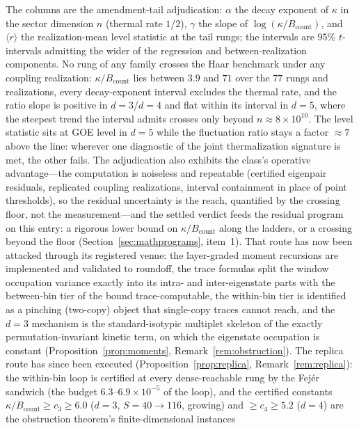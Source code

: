 \documentclass[11pt,a4paper]{article}
\theoremstyle{plain}
\theoremstyle{definition}
\theoremstyle{remark}
\begin{document}
\noindent The columns are the amendment-tail adjudication: $\alpha$ the decay exponent
of $\kappa$ in the sector dimension $n$ (thermal rate $1/2$), $\gamma$ the slope of
$\log(\kappa/B_{\mathrm{count}})$, and $\langle r\rangle$ the realization-mean level
statistic at the tail rungs; the intervals are $95\%$ $t$-intervals admitting the wider
of the regression and between-realization components. No rung of any family crosses
the Haar benchmark under any coupling realization: $\kappa/B_{\mathrm{count}}$ lies
between $3.9$ and $71$ over the $77$ rungs and realizations, every decay-exponent
interval excludes the thermal rate, and the ratio slope is positive in $d=3$/$d=4$ and
flat within its interval in $d=5$, where the steepest trend the interval admits crosses
only beyond $n\approx8\times10^{10}$. The level statistic sits at GOE level in $d=5$
while the fluctuation ratio stays a factor $\approx7$ above the line: wherever one
diagnostic of the joint thermalization signature is met, the other fails. The
adjudication also exhibits the class's operative advantage---the computation is
noiseless and repeatable (certified eigenpair residuals, replicated coupling
realizations, interval containment in place of point thresholds), so the residual
uncertainty is the reach, quantified by the crossing floor, not the measurement---and
the settled verdict feeds the residual program on this entry: a rigorous lower bound on
$\kappa/B_{\mathrm{count}}$ along the ladders, or a crossing beyond the floor
(Section~\ref{sec:mathprograms}, item~1). That route has now been attacked through its
registered venue: the layer-graded moment recursions are implemented and validated to
roundoff, the trace formulas split the window occupation variance exactly into its
intra- and inter-eigenstate parts with the between-bin tier of the bound
trace-computable, the within-bin tier is identified as a pinching (two-copy) object
that single-copy traces cannot reach, and the $d=3$ mechanism is the standard-isotypic
multiplet skeleton of the exactly permutation-invariant kinetic term, on which the
eigenstate occupation is constant
(Proposition~\ref{prop:moments}, Remark~\ref{rem:obstruction}). The replica route has
since been executed (Proposition~\ref{prop:replica}, Remark~\ref{rem:replica}): the
within-bin loop is certified at every dense-reachable rung by the Fej\'er sandwich
(the budget $6.3$--$6.9\times10^{-5}$ of the loop), and the certified constants
$\kappa/B_{\mathrm{count}}\ge c_{3}\ge6.0$ ($d=3$, $S=40\to116$, growing) and
$\ge c_{4}\ge5.2$ ($d=4$) are the obstruction theorem's finite-dimensional instances
\end{document}
